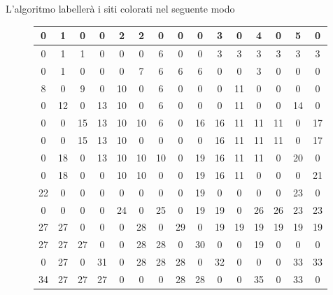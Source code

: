 \begin{figure}[H]
\begin{minipage}{0.5\textwidth}
		\label{fig:basegrid}
	\end{minipage}
\end{figure}

L'algoritmo labellerà i siti colorati nel seguente modo
\begin{figure}[H]
	\centering
	\scriptsize %
	\setlength{\tabcolsep}{3.5pt} %
	\renewcommand{\arraystretch}{1.3} %
	\begin{minipage}{0.45\textwidth}
		\centering
		\begin{center}
			\begin{tabular}{|*{15}{c|}}
				\hline
				0 & 1 & 0 & 0 & 2 & 2 & 0 & 0 & 0 & 3 & 0 & 4 & 0 & 5 & 0 \\
				\hline
				0 & 1 & 1 & 0 & 0 & 0 & 6 & 0 & 0 & 3 & 3 & 3 & 3 & 3 & 3 \\
				\hline
				0 & 1 & 0 & 0 & 0 & 7 & 6 & 6 & 6 & 0 & 0 & 3 & 0 & 0 & 0 \\
				\hline
				8 & 0 & 9 & 0 & 10 & 0 & 6 & 0 & 0 & 0 & 11 & 0 & 0 & 0 & 0 \\
				\hline
				0 & 12 & 0 & 13 & 10 & 0 & 6 & 0 & 0 & 0 & 11 & 0 & 0 & 14 & 0 \\
				\hline
				0 & 0 & 15 & 13 & 10 & 10 & 6 & 0 & 16 & 16 & 11 & 11 & 11 & 0 & 17 \\
				\hline
				0 & 0 & 15 & 13 & 10 & 0 & 0 & 0 & 0 & 16 & 11 & 11 & 11 & 0 & 17 \\
				\hline
				0 & 18 & 0 & 13 & 10 & 10 & 10 & 0 & 19 & 16 & 11 & 11 & 0 & 20 & 0 \\
				\hline
				0 & 18 & 0 & 0 & 10 & 10 & 0 & 0 & 19 & 16 & 11 & 0 & 0 & 0 & 21 \\
				\hline
				22 & 0 & 0 & 0 & 0 & 0 & 0 & 0 & 19 & 0 & 0 & 0 & 0 & 23 & 0 \\
				\hline
				0 & 0 & 0 & 0 & 24 & 0 & 25 & 0 & 19 & 19 & 0 & 26 & 26 & 23 & 23 \\
				\hline
				27 & 27 & 0 & 0 & 0 & 28 & 0 & 29 & 0 & 19 & 19 & 19 & 19 & 19 & 19 \\
				\hline
				27 & 27 & 27 & 0 & 0 & 28 & 28 & 0 & 30 & 0 & 0 & 19 & 0 & 0 & 0 \\
				\hline
				0 & 27 & 0 & 31 & 0 & 28 & 28 & 28 & 0 & 32 & 0 & 0 & 0 & 33 & 33 \\
				\hline
				34 & 27 & 27 & 27 & 0 & 0 & 0 & 28 & 28 & 0 & 0 & 35 & 0 & 33 & 0 \\
				\hline
			\end{tabular}
		\end{center}

\end{minipage}
\end{figure}
